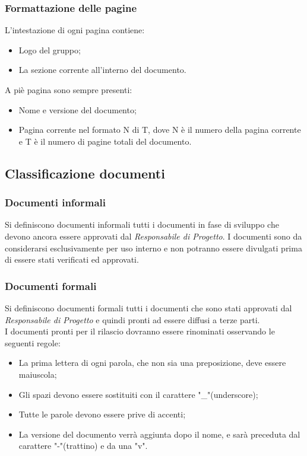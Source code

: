 \subsubsection{Formattazione delle pagine}
L'intestazione di ogni pagina contiene:
\begin{itemize}
	\item Logo del gruppo;
	\item La sezione corrente all'interno del documento.
\end{itemize}
A piè pagina sono sempre presenti:
\begin{itemize}
	\item Nome e versione del documento;
	\item Pagina corrente nel formato N di T, dove N è il numero della pagina corrente e T è il numero di pagine totali del documento.
\end{itemize}

\subsection{Classificazione documenti}
\subsubsection{Documenti informali}
Si definiscono documenti informali tutti i documenti in fase di sviluppo che devono ancora essere approvati dal \textit{Responsabile di Progetto}. I documenti sono da considerarsi esclusivamente per uso interno e non potranno essere divulgati prima di essere stati verificati ed approvati. 
\subsubsection{Documenti formali}
Si definiscono documenti formali tutti i documenti che sono stati approvati dal \textit{Responsabile di Progetto} e quindi pronti ad essere diffusi a terze parti.\\
I documenti pronti per il rilascio dovranno essere rinominati osservando le seguenti regole:
\begin{itemize}
	\item La prima lettera di ogni parola, che non sia una preposizione, deve essere maiuscola;
	\item Gli spazi devono essere sostituiti con il carattere "\_"(underscore);
	\item Tutte le parole devono essere prive di accenti;
	\item La versione del documento verrà aggiunta dopo il nome, e sarà preceduta dal carattere "-"(trattino) e da una "v".
\end{itemize}

